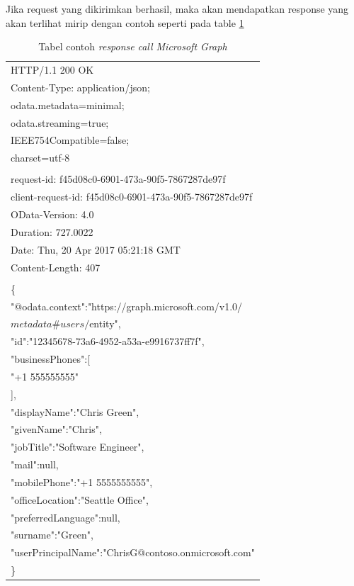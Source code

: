 Jika request yang dikirimkan berhasil, maka akan mendapatkan response yang akan terlihat mirip dengan contoh seperti pada table \ref{tab:contoh_response_call_microsoft_graph}

\begin{table}[H]
	\centering 
	\caption{Tabel contoh \textit{response} \textit{call Microsoft Graph}}
	\label{tab:contoh_response_call_microsoft_graph}
	\begin{tabular}{|p{12cm}|}
	\toprule
	HTTP/1.1 200 OK\\
Content-Type: application/json;\\
odata.metadata=minimal;\\
odata.streaming=true;\\
IEEE754Compatible=false;\\
charset=utf-8\\
\\
request-id: f45d08c0-6901-473a-90f5-7867287de97f\\
client-request-id: f45d08c0-6901-473a-90f5-7867287de97f\\
OData-Version: 4.0\\
Duration: 727.0022\\
Date: Thu, 20 Apr 2017 05:21:18 GMT\\
Content-Length: 407\\
\\
\{\\
    "@odata.context":"https://graph.microsoft.com/v1.0/\\
    $metadata\#users/$entity",\\
    "id":"12345678-73a6-4952-a53a-e9916737ff7f",\\
    "businessPhones":[\\
        "+1 555555555"\\
    ],\\
    "displayName":"Chris Green",\\
    "givenName":"Chris",\\
    "jobTitle":"Software Engineer",\\
    "mail":null,\\
    "mobilePhone":"+1 5555555555",\\
    "officeLocation":"Seattle Office",\\
    "preferredLanguage":null,\\
    "surname":"Green",\\
    "userPrincipalName":"ChrisG@contoso.onmicrosoft.com"\\
\}\\
	\bottomrule
	\end{tabular}  
\end{table}

